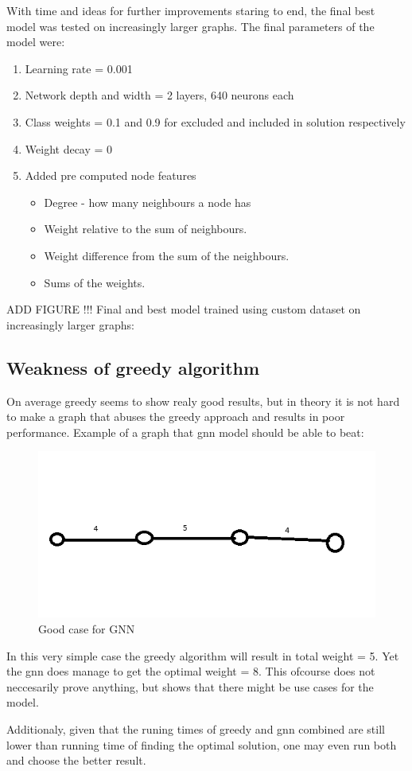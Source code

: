 With time and ideas for further improvements staring to end, the final best model was tested on increasingly larger graphs. The final parameters of the model were:

\begin{enumerate}
\item Learning rate = 0.001
\item Network depth and width = 2 layers, 640 neurons each
\item Class weights = 0.1 and 0.9 for excluded and included in solution respectively
\item Weight decay = 0
\item Added pre computed node features
	\begin{itemize}
	\item Degree - how many neighbours a node has
	\item Weight relative to the sum of neighbours.
	\item Weight difference from the sum of the neighbours.
	\item Sums of the weights. 
	\end{itemize}
\end{enumerate}

ADD FIGURE !!! Final and best model trained using custom dataset on increasingly larger graphs:

\subsection{Weakness of greedy algorithm}

On average greedy seems to show realy good results, but in theory it is not hard to make a graph that abuses the greedy approach and results in poor performance. Example of a graph that \gls{gnn} model should be able to beat:

\begin{figure}[H]
    \centering
    \includegraphics[scale=1.0]{figures/GoodCase}
    \caption{Good case for GNN}
    \label{Good case for GNN}
\end{figure}

In this very simple case the greedy algorithm will result in total weight = 5. Yet the \gls{gnn} does manage to get the optimal weight = 8. This ofcourse does not neccesarily prove anything, but shows that there might be use cases for the model. 

Additionaly, given that the runing times of greedy and \gls{gnn} combined are still lower than running time of finding the optimal solution, one may even run both and choose the better result.